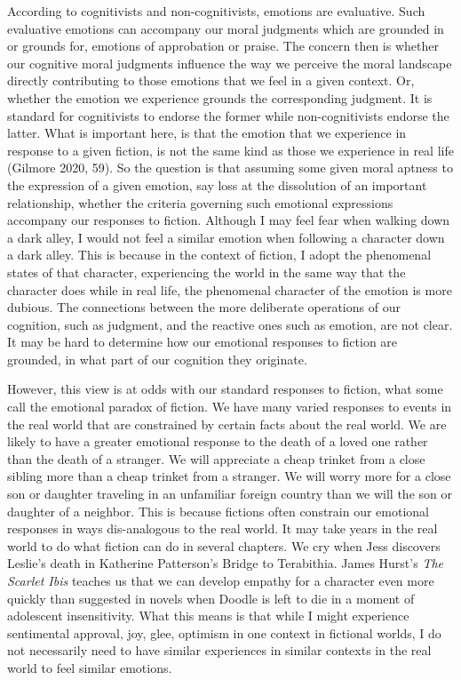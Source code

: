 \documentclass[12pt]{book}
\theoremstyle{definition}
\theoremstyle{remark}
\begin{document}
According to cognitivists and non-cognitivists, emotions are evaluative. Such evaluative emotions can accompany our moral judgments which are grounded in or grounds for, emotions of approbation or praise. The concern then is whether our cognitive moral judgments influence the way we perceive the moral landscape directly contributing to those emotions that we feel in a given context. Or, whether the emotion we experience grounds the corresponding judgment. It is standard for cognitivists to endorse the former while non-cognitivists endorse the latter. What is important here, is that the emotion that we experience in response to a given fiction, is not the same kind as those we experience in real life (Gilmore 2020, 59). So the question is that assuming some given moral aptness to the expression of a given emotion, say loss at the dissolution of an important relationship, whether the criteria governing such emotional expressions accompany our responses to fiction. Although I may feel fear when walking down a dark alley, I would not feel a similar emotion when following a character down a dark alley. This is because in the context of fiction, I adopt the phenomenal states of that character, experiencing the world in the same way that the character does while in real life, the phenomenal character of the emotion is more dubious. The connections between the more deliberate operations of our cognition, such as judgment, and the reactive ones such as emotion, are not clear. It may be hard to determine how our emotional responses to fiction are grounded, in what part of our cognition they originate.

However, this view is at odds with our standard responses to fiction, what some call the emotional paradox of fiction. We have many varied responses to events in the real world that are constrained by certain facts about the real world. We are likely to have a greater emotional response to the death of a loved one rather than the death of a stranger. We will appreciate a cheap trinket from a close sibling more than a cheap trinket from a stranger. We will worry more for a close son or daughter traveling in an unfamiliar foreign country than we will the son or daughter of a neighbor. This is because fictions often constrain our emotional responses in ways dis-analogous to the real world. It may take years in the real world to do what fiction can do in several chapters. We cry when Jess discovers Leslie's death in Katherine Patterson's Bridge to Terabithia. James Hurst's \emph{The Scarlet Ibis} teaches us that we can develop empathy for a character even more quickly than suggested in novels when Doodle is left to die in a moment of adolescent insensitivity. What this means is that while I might experience sentimental approval, joy, glee, optimism in one context in fictional worlds, I do not necessarily need to have similar experiences in similar contexts in the real world to feel similar emotions.
\end{document}
